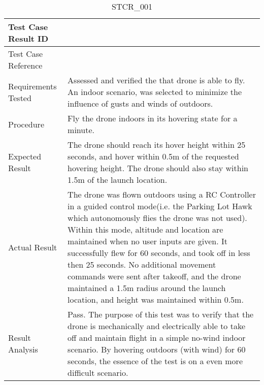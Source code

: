\documentclass[12pt, titlepage]{article}
\begin{document}
\begin{table}[!h]
\begin{center}
\caption {STCR\_001}
\label{tab:STCR_001}
\begin{tabular}{ | m{3.2cm} | m{12.2cm} | } 
\hline
Test Case Result ID & \nameref{tab:STCR_001} \\ 
\hline
Test Case Reference & \nameref{tab:STC_001}  \\ 
\hline
Requirements Tested & Assessed and verified the that drone is able to fly. An indoor scenario, was selected  to minimize the influence of gusts and winds of outdoors. \\ 
\hline
Procedure & Fly the drone indoors in its hovering state for a minute. \\ 
\hline
Expected Result & The drone should reach its hover height within 25 seconds, and hover within 0.5m of the requested hovering height. The drone should also stay within 1.5m of the launch location.  \\ 
\hline
Actual Result & The drone was flown outdoors using a RC Controller in a guided control mode(i.e. the Parking Lot Hawk which autonomously flies the drone was not used). Within this mode, altitude and location are maintained when no user inputs are given. It successfully flew for 60 seconds, and took off in less then 25 seconds. No additional movement commands were sent after takeoff, and the drone maintained a 1.5m radius around the launch location, and height was maintained within 0.5m.  \\ 
\hline
Result Analysis & Pass. The purpose of this test was to verify that the drone is mechanically and electrically able to take off and maintain flight in a simple no-wind indoor scenario. By hovering outdoors (with wind) for 60 seconds, the essence of the test is on a even more difficult scenario.  \\ 
\hline
\end{tabular}
\end{center}
\end{table}
\end{document}
